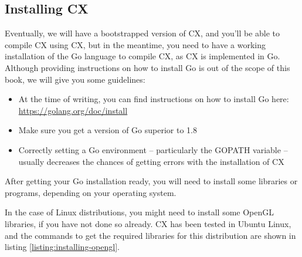 \documentclass[11pt,fleqn,openany]{book} %
\begin{document}
\begin{appendices}
\chapter{Installing CX}


Eventually, we will have a bootstrapped version of CX, and you'll be able to compile CX using CX, but in the meantime, you need to have a working installation of the Go language to compile CX, as CX is implemented in Go. Although providing instructions on how to install Go is out of the scope of this book, we will give you some guidelines:

\begin{itemize}
\item At the time of writing, you can find instructions on how to install Go here: \url{https://golang.org/doc/install}
\item Make sure you get a version of Go superior to 1.8
\item Correctly setting a Go environment -- particularly the GOPATH variable -- usually decreases the chances of getting errors with the installation of CX
\end{itemize}

After getting your Go installation ready, you will need to install some libraries or programs, depending on your operating system.

In the case of Linux distributions, you might need to install some OpenGL libraries, if you have not done so already. CX has been tested in Ubuntu Linux, and the commands to get the required libraries for this distribution are shown in listing \ref{listing:installing-opengl}.


\end{appendices}
\end{document}
